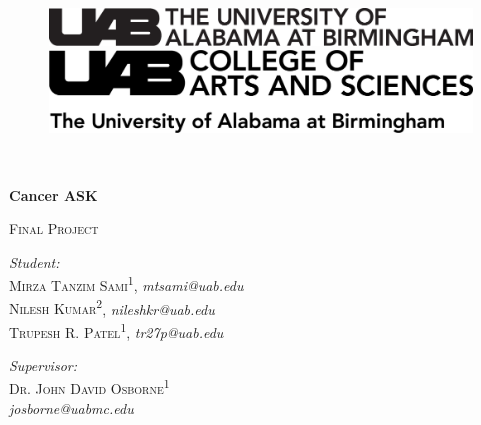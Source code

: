\begin{titlepage}
	\begin{figure}[t]
		\begin{minipage}{0.55\textwidth}
			\begin{flushleft}
				\includegraphics[scale=0.7]{Images/black-without-R-core-standard.png}
			\end{flushleft}
		\end{minipage}
		\hfill
		\begin{minipage}{0.44\textwidth}
			\begin{flushright}
				\includegraphics[scale=0.5]{Images/black-without-R-standard.png}
			\end{flushright}
		\end{minipage}
	\end{figure}
	
	\quad\\
	\center
	\begin{spacing}{2.0}
		{{ \textbf{\LARGE Cancer ASK}}}
	\end{spacing}
	
	\vspace{2in}
	\textsc{ {\Large Final Project}} 
	\vspace{3in}

	\begin{minipage}{0.49\textwidth}
		\begin{flushleft}
			\textit{Student:} \\
			\textsc{Mirza Tanzim Sami\textsuperscript{1}}, \textsl{mtsami@uab.edu}\\
			\textsc{Nilesh Kumar\textsuperscript{2}}, \textsl{nileshkr@uab.edu}\\
			\textsc{Trupesh R. Patel\textsuperscript{1}}, \textsl{tr27p@uab.edu}
		\end{flushleft}
	\end{minipage}
	\begin{minipage}{0.5\textwidth}
		\begin{flushright}
			\textit{Supervisor:} \\
			\textsc{Dr. John David Osborne\textsuperscript{1}}\\
			\textsl{josborne@uabmc.edu}
		\end{flushright}
	\end{minipage}


\end{titlepage}
